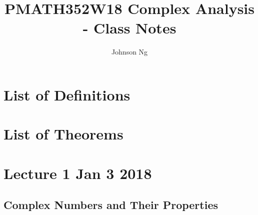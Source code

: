 \documentclass[11pt, oneside]{book}
\title{PMATH352W18 Complex Analysis - Class Notes}
\author{Johnson Ng}
\theoremstyle{break}
\begin{document}
\hypersetup{pageanchor=false}
\maketitle
\hypersetup{pageanchor=true}
\tableofcontents

\chapter*{List of Definitions}

\chapter*{List of Theorems}

\chapter{Lecture 1 Jan 3 2018}
	\label{chapter:lecture_1_jan_3_2018}

\section{Complex Numbers and Their Properties} %
\label{sec:complex_numbers_and_their_properties}
\end{document}
